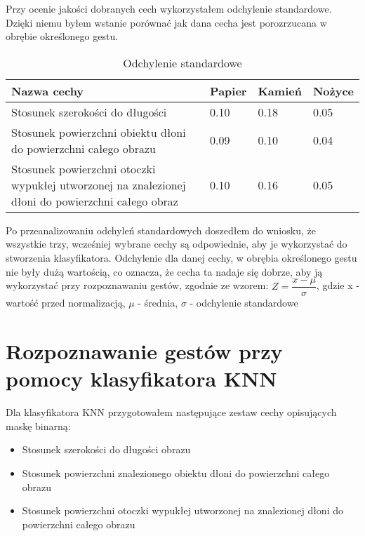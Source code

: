 \documentclass[a4paper,12pt,twoside,openany]{report}
\begin{document}
Przy ocenie jakości dobranych cech wykorzystałem odchylenie standardowe. Dzięki niemu byłem wstanie porównać jak dana cecha jest porozrzucana w obrębie określonego gestu.

\begin{table}[H]
	\centering
	\begin{tabularx}{\textwidth}{|X|l|l|l|}
		\hline
		\textbf{Nazwa cechy} & \textbf{Papier} & \textbf{Kamień} & \textbf{Nożyce} \\ 
		
		\hline
		Stosunek szerokości do długości & 0.10 & 0.18 & 0.05 \\ 
		
		\hline
		Stosunek powierzchni obiektu dłoni do powierzchni całego obrazu & 0.09 & 0.10 & 0.04 \\ 
		
		\hline
		Stosunek powierzchni otoczki wypukłej utworzonej na znalezionej dłoni do powierzchni całego obraz & 0.10 & 0.16 & 0.05 \\ 
		\hline
	\end{tabularx}
	
	\caption{Odchylenie standardowe}
\end{table}

Po przeanalizowaniu odchyleń standardowych doszedłem do wniosku, że wszystkie trzy, wcześniej wybrane cechy są odpowiednie, aby je wykorzystać do stworzenia klasyfikatora. Odchylenie dla danej cechy, w obrębia określonego gestu nie były dużą wartością, co oznacza, że cecha ta nadaje się dobrze, aby ją wykorzystać przy rozpoznawaniu gestów, zgodnie ze wzorem: $ Z = \dfrac{x - \mu}{\sigma} $, gdzie x - wartość przed normalizacją, $\mu$ - średnia, $\sigma$ - odchylenie standardowe

\section{Rozpoznawanie gestów przy pomocy klasyfikatora KNN}
Dla klasyfikatora KNN przygotowałem następujące zestaw cechy opisujących maskę binarną: 
\begin{itemize}
	\item Stosunek szerokości do długości obrazu
	\item Stosunek powierzchni znalezionego obiektu dłoni do powierzchni całego obrazu
	\item Stosunek powierzchni otoczki wypukłej utworzonej na znalezionej dłoni do powierzchni całego obrazu
\end{itemize}
\end{document}
